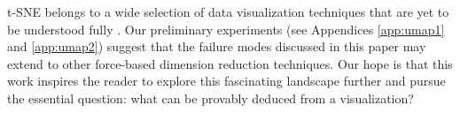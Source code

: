  
 





t-SNE belongs to a wide selection of data visualization techniques that are yet to be understood fully \citep{mcinnes2018umap, jacomy2014forceatlas2, tang2016visualizing, amid2019trimap}. {Our preliminary experiments (see Appendices \ref{app:umap1} and \ref{app:umap2}) suggest that the failure modes discussed in this paper may extend to other force-based dimension reduction techniques.} Our hope is that this work inspires the reader to explore this fascinating landscape further and pursue the essential question: what can be provably deduced from a visualization?







 

 

